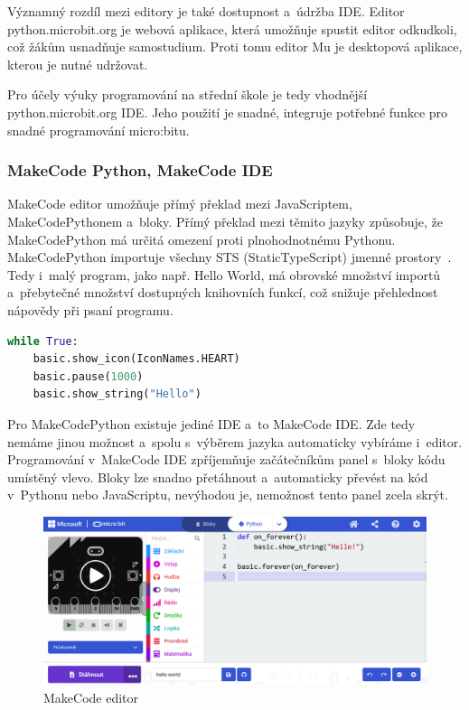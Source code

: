 \documentclass[
  digital,     %
  oneside,     %
  nosansbold,  %
  colorbold, %
  lof,         %
  nolot,         %
]{fithesis4}
\begin{document}
Významný rozdíl mezi editory je také dostupnost a~údržba IDE. Editor python.microbit.org je webová aplikace, která umožňuje spustit editor odkudkoli, což žákům usnadňuje samostudium. Proti tomu editor Mu je desktopová aplikace, kterou je nutné udržovat. 

Pro účely výuky programování na střední škole je tedy vhodnější python.microbit.org IDE. Jeho použití je snadné, integruje potřebné funkce pro snadné programování micro:bitu.

\subsubsection{MakeCode Python, MakeCode IDE}

MakeCode editor umožňuje přímý překlad mezi JavaScriptem, MakeCodePythonem a~bloky. Přímý překlad mezi těmito jazyky způsobuje, že MakeCodePython má určitá omezení proti plnohodnotnému Pythonu. MakeCodePython importuje všechny STS (StaticTypeScript) jmen\-né prostory~\cite{makeCodePython}. Tedy i~malý program, jako např. Hello World, má obrovské množství importů a~přebytečné množství dostupných knihovních funkcí, což snižuje přehlednost nápovědy při psaní programu.

\begin{footnotesize}
\begin{lstlisting}[language=Python, caption=MakeCode Python ukázka]
while True:
    basic.show_icon(IconNames.HEART)
    basic.pause(1000)
    basic.show_string("Hello")
\end{lstlisting}
\end{footnotesize}

Pro MakeCodePython existuje jediné IDE a~to MakeCode IDE. Zde tedy nemáme jinou možnost a~spolu s~výběrem jazyka automaticky vybíráme i~editor. Programování v~MakeCode IDE zpříjemňuje začátečníkům panel s~bloky kódu umístěný vlevo. Bloky lze snadno přetáhnout a~automaticky převést na kód v~Pythonu nebo JavaScriptu, nevýhodou je, nemožnost tento panel zcela skrýt.

\begin{figure}[ht]
    \centering
    \includegraphics[width=\textwidth]  {images/makecodeE.png}
    \caption{MakeCode editor}
\end{figure}
\end{document}
